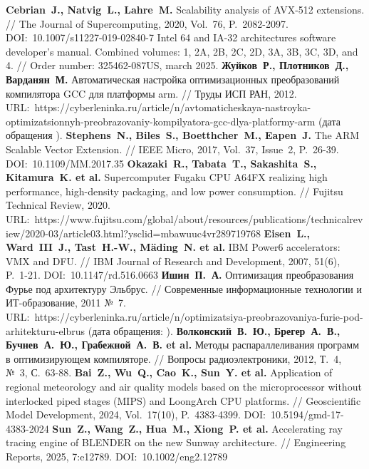 \begin{thebibliography}{99}
\textbf{Cebrian~J., Natvig~L., Lahre~M.} Scalability analysis of AVX-512 extensions. // The Journal of Supercomputing, 2020, Vol.~76, P.~2082-2097. DOI:~10.1007/s11227-019-02840-7
Intel 64 and IA-32 architectures software developer's manual. Combined volumes: 1, 2A, 2B, 2C, 2D, 3A, 3B, 3C, 3D, and 4. // Order number: 325462-087US, march 2025.
\textbf{Жуйков~Р., Плотников~Д., Варданян~М.} Автоматическая настройка оптимизационных преобразований компилятора GCC для платформы arm. // Труды ИСП РАН, 2012. URL:~https://cyberleninka.ru/article/n/avtomaticheskaya-nastroyka-optimizatsionnyh-preobrazovaniy-kompilyatora-gcc-dlya-platformy-arm (дата обращения \StrDate).
\textbf{Stephens~N., Biles~S., Boetthcher~M., Eapen~J.} The ARM Scalable Vector Extension. // IEEE Micro, 2017, Vol.~37, Issue~2, P.~26-39. DOI:~10.1109/MM.2017.35
\textbf{Okazaki~R., Tabata~T., Sakashita~S., Kitamura~K. et al.} Supercomputer Fugaku CPU A64FX realizing high performance, high-density packaging, and low power consumption. // Fujitsu Technical Review, 2020. URL:~https://www.fujitsu.com/global/about/resources/publications/technicalreview/2020-03/article03.html?ysclid=mbawuuc4vr289719768
\textbf{Eisen~L., Ward~III~J., Tast~H.-W., M{\"a}ding~N. et al.} IBM Power6 accelerators: VMX and DFU. // IBM Journal of Research and Development, 2007, 51(6), P.~1-21. DOI:~10.1147/rd.516.0663
\textbf{Ишин~П.~А.} Оптимизация преобразования Фурье под архитектуру Эльбрус. // Современные информационные технологии и ИТ-образование, 2011 №~7. URL:~https://cyberleninka.ru/article/n/optimizatsiya-preobrazovaniya-furie-pod-arhitekturu-elbrus (дата обращения: \StrDate).
\textbf{Волконский~В.~Ю., Брегер~А.~В., Бучнев~А.~Ю., Грабежной~А.~В. et al.} Методы распараллеливания программ в оптимизирующем компиляторе. // Вопросы радиоэлектроники, 2012, Т.~4, №~3, С.~63-88.
\textbf{Bai~Z., Wu~Q., Cao~K., Sun~Y. et al.} Application of regional meteorology and air quality models based on the microprocessor without interlocked piped stages (MIPS) and LoongArch CPU platforms. // Geoscientific Model Development, 2024, Vol.~17(10), P.~4383-4399. DOI:~10.5194/gmd-17-4383-2024
\textbf{Sun~Z., Wang~Z., Hua~M., Xiong~P. et al.} Accelerating ray tracing engine of BLENDER on the new Sunway architecture. // Engineering Reports, 2025, 7:e12789. DOI:~10.1002/eng2.12789


\end{thebibliography}
